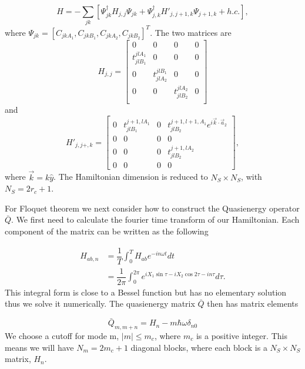 \begin{equation}
  H = -\sum_{jk} \left[ \Psi^{\dagger}_{jk} H_{j,j} \Psi_{jk} + \Psi^{\dagger}_{j,k} H'_{j,j+1,k} \Psi_{j+1,k} + h.c. \right],
\end{equation}
where $\Psi_{jk} = [C_{jkA_1}, C_{jkB_1}, C_{jkA_2}, C_{jkB_2}]^T$. The two matrices are
\[
  H_{j,j} =
  \begin{bmatrix}
    0 & 0 & 0 & 0 \\
    t^{jlA_1}_{jlB_1} & 0 & 0 & 0 \\
    0 & t^{jlB_1}_{jlA_2} & 0 & 0 \\
    0 & 0 & t^{jlA_2}_{jlB_2} & 0 \\
  \end{bmatrix}
\]
and
\[
  H'_{j,j+,k} =
  \begin{bmatrix}
    0 & t^{j+1,lA_1}_{jlB_1} & 0 & t^{j+1,l+1,A_1}_{jlB_2} e^{i\vec{k}\cdot\vec{a}_2} \\
    0 & 0 & 0 & 0 \\
    0 & 0 & 0 & t^{j+1,lA_2}_{jlB_2} \\
    0 & 0 & 0 & 0
  \end{bmatrix},
\]
where $\vec{k} = k \hat{y}$.
The Hamiltonian dimension is reduced to $N_S \times N_S$, with $N_S = 2r_c+1$.

For Floquet theorem we next consider how to construct the Quasienergy operator $\bar{Q}$.
We first need to calculate the fourier time transform of our Hamiltonian.
Each component of the matrix can be written as the following

\begin{align}
  H_{ab, n} &= \dfrac{1}{T} \int^T_0 H_{ab} e^{-i n \omega t} dt \nonumber \\
  &= \dfrac{1}{2\pi} \int^{2\pi}_0 e^{iX_1\sin{\tau} - iX_2\cos{2\tau} - i n \tau} d\tau.
\end{align}
This integral form is close to a Bessel function but has no elementary solution thus we solve it numerically.
The quasienergy matrix $\bar{Q}$ then has matrix elements

\begin{equation}
  \bar{Q}_{m,m+n} = H_n - m \hbar \omega \delta_{n0}
\end{equation}
We choose a cutoff for mode m, $|m| \leq m_c$, where $m_c$ is a positive integer.
This means we will have $N_m = 2 m_c +1$ diagonal blocks, where each block is a $N_S \times N_S$ matrix, $H_n$.

